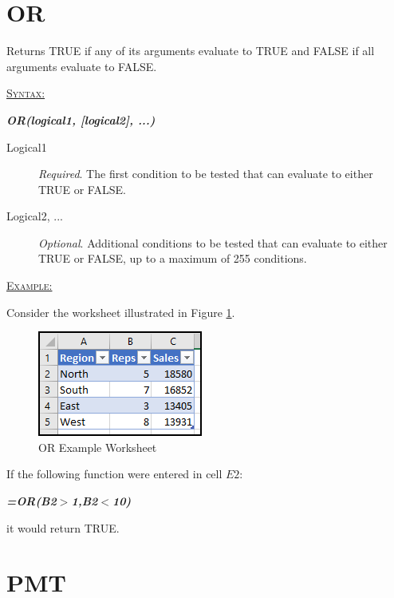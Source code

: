 \section{OR}

Returns TRUE if any of its arguments evaluate to TRUE and FALSE if all arguments evaluate to FALSE.

\begin{addmargin}[1cm]{0cm}
	
	\medskip
	\underline{\textsc{Syntax:}}
	\medskip
	
	{\color{Syntax}
		\noindent\textit{\textbf{OR(logical1, [logical2], ...)}}
	}
	
	\begin{description}
		\item[Logical1] \textit{Required}. The first condition to be tested that can evaluate to either TRUE or FALSE.
		\item[Logical2, ...] \textit{Optional}. Additional conditions to be tested that can evaluate to either TRUE or FALSE, up to a maximum of 255 conditions.
	\end{description}

	\medskip
	\noindent\underline{\textsc{Example:}}
	\medskip
	
	\noindent Consider the worksheet illustrated in Figure \ref{apa:or}.
	
	\begin{figure}[H]
		\centering
		\includegraphics[width=\maxwidth{.45\linewidth}]{gfx/apa_fig01}
		\caption{OR Example Worksheet}
		\label{apa:or}
	\end{figure}
	
	\noindent If the following function were entered in cell $ E2 $:
	
	{\color{Syntax}
		\textit{\textbf{=OR(B2$>$1,B2$<$10)}}
	}
	
	\noindent it would return TRUE.

\end{addmargin}

\section{PMT}

